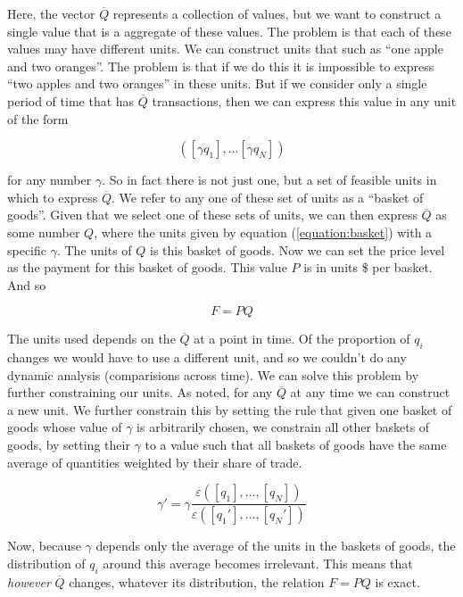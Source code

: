 Here, the vector $\overline Q$ represents a collection of values, but we want to construct a single
value that is a aggregate of these values. The problem is that each of these values may have
different units. We can construct units that such as ``one apple and two oranges''. The problem is
that if we do this it is impossible to express ``two apples and two oranges'' in these units. But if
we consider only a single period of time that has $\overline Q$ transactions, then we can express
this value in any unit of the form

\begin{equation}\label{equation:basket}
    \left( \left[ \gamma q_1 \right], \dots \left[ \gamma q_N \right] \right)
\end{equation}

for any number $\gamma$. So in fact there is not just one, but a set of feasible units in which to
express $\overline Q$. We refer to any one of these set of units as a ``basket of goods''. Given
that we select one of these sets of units, we can then express $\overline Q$ as some number $Q$,
where the units given by equation (\ref{equation:basket}) with a specific $\gamma$. The units of
$Q$ is this basket of goods. Now we can set the price level as the payment for this basket of goods.
This value $P$ is in units \$ per basket. And so

\[
    F = PQ
\]

The units used depends on the $\overline Q$ at a point in time. Of the proportion of $q_i$ changes
we would have to use a different unit, and so we couldn't do any dynamic analysis (comparisions
across time). We can solve this problem by further constraining our units. As noted, for any
$\overline Q$ at any time we can construct a new unit. We further constrain this by setting the rule
that given one basket of goods whose value of $\gamma$ is arbitrarily chosen, we constrain all other
baskets of goods, by setting their $\gamma$ to a value such that all baskets of goods have the same  
average of quantities weighted by their share of trade.

\begin{equation}
    \gamma' =  \gamma \frac {\varepsilon \left( \left[ q_1 \right], \dots, \left[ q_N \right] \right)}
    {\varepsilon \left( \left[ {q_1}' \right], \dots, \left[ {q_N}' \right] \right)}
\end{equation}

Now, because $\gamma$ depends only the average of the units in the baskets of goods, the distribution of
$q_i$ around this average becomes irrelevant. This means that \textit{however} $\overline Q$
changes, whatever its distribution, the relation $F=PQ$ is exact.  

